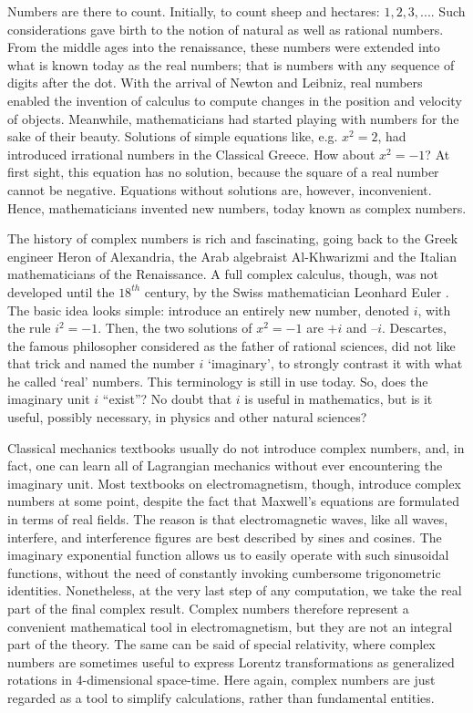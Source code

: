 \documentclass[onecolumn,prx,amsmath,amssymb]{revtex4-2}
\begin{document}
Numbers are there to count. Initially, to count sheep and hectares: $1,2,3,...$. Such considerations gave birth to the notion of natural as well as rational numbers. From the middle ages into the renaissance, these numbers were extended into what is known today as the real numbers; that is numbers with any sequence of digits after the dot. With the arrival of Newton and Leibniz, real numbers enabled the invention of calculus to compute changes in the position and velocity of objects. Meanwhile, mathematicians had started playing with numbers for the sake of their beauty. Solutions of simple equations like, e.g. $x^2=2$, had introduced irrational numbers in the Classical Greece. How about $x^2=-1$? At first sight, this equation has no solution, because the square of a real number cannot be negative. Equations without solutions are, however, inconvenient. Hence, mathematicians invented new numbers, today known as complex numbers.

The history of complex numbers is rich and fascinating, going back to the Greek engineer Heron of Alexandria, the Arab algebraist Al-Khwarizmi and the Italian mathematicians of the Renaissance. A full complex calculus, though, was not developed until the $18^{th}$ century, by the Swiss mathematician Leonhard Euler \cite{complex_numbers}. The basic idea looks simple: introduce an entirely new number, denoted $i$, with the rule $i^2=-1$. Then, the two solutions of $x^2=-1$ are $+i$ and $–i$. Descartes, the famous philosopher considered as the father of rational sciences, did not like that trick and named the number $i$ `imaginary', to strongly contrast it with what he called `real' numbers. This terminology is still in use today. 
So, does the imaginary unit $i$ ``exist''? No doubt that $i$ is useful in mathematics, but is it useful, possibly necessary, in physics and other natural sciences?

Classical mechanics textbooks usually do not introduce complex numbers, and, in fact, one can learn all of Lagrangian mechanics without ever encountering the imaginary unit. Most textbooks on electromagnetism, though, introduce complex numbers at some point, despite the fact that Maxwell's equations are formulated in terms of real fields. The reason is that electromagnetic waves, like all waves, interfere, and interference figures are best described by sines and cosines. The imaginary exponential function allows us to easily operate with such sinusoidal functions, without the need of constantly invoking cumbersome trigonometric identities. Nonetheless, at the very last step of any computation, we take the real part of the final complex result. Complex numbers therefore represent a convenient mathematical tool in electromagnetism, but they are not an integral part of the theory.
The same can be said of special relativity, where complex numbers are sometimes useful to express Lorentz transformations as generalized rotations in 4-dimensional space-time. Here again, complex numbers are just regarded as a tool to simplify calculations, rather than fundamental entities.
\end{document}
